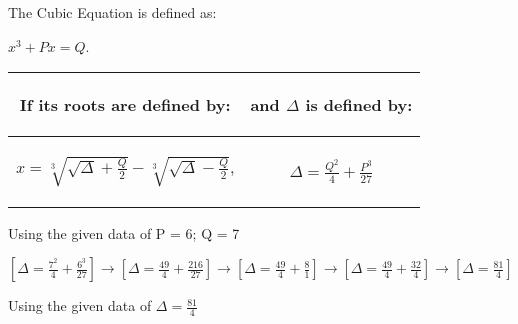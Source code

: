 \documentclass[11pt]{article}
\begin{document}
	\begin{center} 
		The Cubic Equation is defined as:
	\end{center}

	\begin{Large} 
		\begin{center}
		$x^3 + Px = Q$.
		\end{center} 
	\end{Large}


	\begin{center}
		\begin{tabular}{|c|c|}
		\hline
			\begin{large}
				If its roots are defined by:
			\end{large}
			&
			\begin{large}
				and $\Delta$ is defined by:
			\end{large}	
		\\ \hline 
			\begin{Large}
			$x = \sqrt[3]{\sqrt{\Delta} + \frac{Q}{2}} - \sqrt[3]{\sqrt{\Delta} - \frac{Q}{2}}$,
			\end{Large}
			&
			\begin{Large}
			$\Delta = \frac{Q^2}{4} + \frac{P^3}{27}$
			\end{Large}
		\\ \hline
		\end{tabular}
	\end{center}
	
	\begin{center}
		Using the given data of P = 6; Q = 7 %
	\end{center}
	
	\begin{center}
		\begin{large}
		$
		 \displaystyle
		  \left[ \Delta = \frac{7^2}{4} + \frac{6^3}{27} \right]
		   \rightarrow		
		  \left[ \Delta = \frac{49}{4} + \frac{216}{27} \right]
		   \rightarrow	  		 
		  \left[ \Delta = \frac{49}{4} + \frac{8}{1} \right]
		   \rightarrow		 
		  \left[ \Delta = \frac{49}{4} + \frac{32}{4} \right]
		   \rightarrow
		  \left[ \Delta = \frac{81}{4} \right]
		$  %
		\end{large}	
	\end{center}
	
	\begin{center}
		Using the given data of $\Delta = \frac{81}{4}$
	\end{center}	
	
\end{document}
